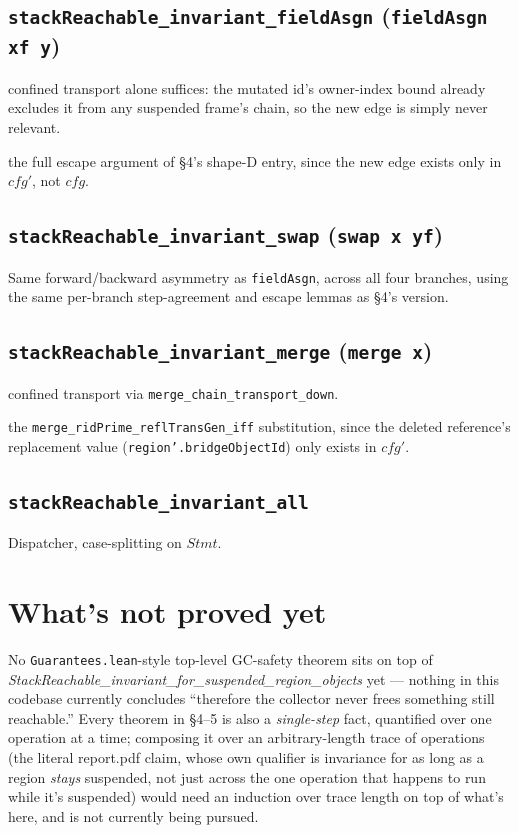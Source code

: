 \documentclass[11pt]{article}
\newcommand{\op}[1]{\texttt{#1}}
\newcommand{\thm}[1]{\textbf{\texttt{#1}}}
\begin{document}
\subsection{\thm{stackReachable\_invariant\_fieldAsgn} (\op{fieldAsgn xf y})}
\begin{description}[nosep]
  \item[Forward] confined transport alone suffices: the mutated id's owner-index bound already
    excludes it from any suspended frame's chain, so the new edge is simply never relevant.
  \item[Backward] the full escape argument of \S4's shape-D entry, since the new edge exists only
    in $cfg'$, not $cfg$.
\end{description}

\subsection{\thm{stackReachable\_invariant\_swap} (\op{swap x yf})}
Same forward/backward asymmetry as \op{fieldAsgn}, across all four branches, using the same
per-branch step-agreement and escape lemmas as \S4's version.

\subsection{\thm{stackReachable\_invariant\_merge} (\op{merge x})}
\begin{description}[nosep]
  \item[Forward] confined transport via \texttt{merge\_chain\_transport\_down}.
  \item[Backward] the \texttt{merge\_ridPrime\_reflTransGen\_iff} substitution, since the deleted
    reference's replacement value (\op{region'.bridgeObjectId}) only exists in $cfg'$.
\end{description}

\subsection{\thm{stackReachable\_invariant\_all}}
Dispatcher, case-splitting on $Stmt$.

\section{What's not proved yet}
No \op{Guarantees.lean}-style top-level GC-safety theorem sits on top of
\textit{StackReachable\_invariant\_for\_suspended\_region\_objects} yet --- nothing in this
codebase currently concludes ``therefore the collector never frees something still reachable.''
Every theorem in \S4--5 is also a \emph{single-step} fact, quantified over one operation at a time;
composing it over an arbitrary-length trace of operations (the literal report.pdf claim, whose own
qualifier is invariance for as long as a region \emph{stays} suspended, not just across the one
operation that happens to run while it's suspended) would need an induction over trace length on
top of what's here, and is not currently being pursued.
\end{document}
